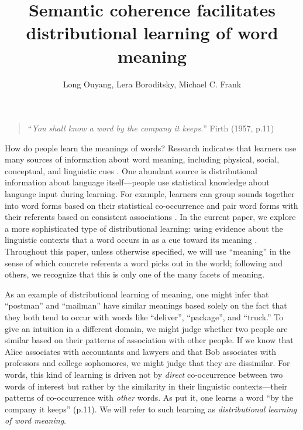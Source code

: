 \documentclass[man,floatsintext]{apa6}
\title{Semantic coherence facilitates distributional learning of word meaning}
\author{Long Ouyang, Lera Boroditsky, Michael C. Frank}
\affiliation{Department of Psychology, Stanford University\vskip 5em Word count: 6,251}
\begin{document}
\maketitle

\begin{quote}
``\emph{You shall know a word by the company it keeps.}'' Firth (1957, p.11)
\end{quote}

How do people learn the meanings of words? Research indicates that learners use many sources of information about word meaning, including physical, social, conceptual, and linguistic cues \citep{clark1988,markman1991,gleitman1990,baldwin1993,hollich2000}. One abundant source is distributional information about language itself---people use statistical knowledge about language input during learning. For example, learners can group sounds together into word forms based on their statistical co-occurrence \citep{saffran1996a, saffran1996b} and pair word forms with their referents based on consistent associations \citep{yu2007,smith2008}. In the current paper, we explore a more sophisticated type of distributional learning: using evidence about the linguistic contexts that a word occurs in as a cue toward its meaning \citep{smith1966, maratsos1980,braine1987,redington1998}. Throughout this paper, unless otherwise specified, we will use ``meaning'' in the sense of which concrete referents a word picks out in the world; following \citet{wittgenstein1953} and others, we recognize that this is only one of the many facets of meaning.

As an example of distributional learning of meaning, one might infer that ``postman'' and ``mailman'' have similar meanings based solely on the fact that they both tend to occur with words like ``deliver'', ``package'', and ``truck.'' To give an intuition in a different domain, we might judge whether two people are  similar based on their patterns of association with other people. If we know that Alice associates with accountants and lawyers and that Bob associates with professors and college sophomores, we might judge that they are dissimilar. For words, this kind of learning is driven not by \emph{direct} co-occurrence between two words of interest but rather by the similarity in their linguistic contexts---their patterns of co-occurrence with \emph{other} words. As \citet{firth1957} put it, one learns a word ``by the company it keeps'' (p.11). We will refer to such learning as \emph{distributional learning of word meaning}.
\end{document}
